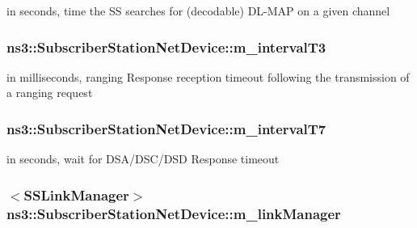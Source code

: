 in seconds, time the SS searches for (decodable) D\+L-\/\+M\+AP on a given channel 

\subsubsection[{\texorpdfstring{m\+\_\+interval\+T3}{m_intervalT3}}]{ ns3\+::\+Subscriber\+Station\+Net\+Device\+::m\+\_\+interval\+T3\hspace{0.3cm}{\ttfamily [private]}}\hypertarget{classns3_1_1SubscriberStationNetDevice_acdf9ce2c9f951c3c8433e36f48058d86}{}\label{classns3_1_1SubscriberStationNetDevice_acdf9ce2c9f951c3c8433e36f48058d86}


in milliseconds, ranging Response reception timeout following the transmission of a ranging request 

\subsubsection[{\texorpdfstring{m\+\_\+interval\+T7}{m_intervalT7}}]{ ns3\+::\+Subscriber\+Station\+Net\+Device\+::m\+\_\+interval\+T7\hspace{0.3cm}{\ttfamily [private]}}\hypertarget{classns3_1_1SubscriberStationNetDevice_afa2eaee4151fb1ddbfa95394ac7ae662}{}\label{classns3_1_1SubscriberStationNetDevice_afa2eaee4151fb1ddbfa95394ac7ae662}


in seconds, wait for D\+S\+A/\+D\+S\+C/\+D\+SD Response timeout 

\subsubsection[{\texorpdfstring{m\+\_\+link\+Manager}{m_linkManager}}]{$<${\bf S\+S\+Link\+Manager}$>$ ns3\+::\+Subscriber\+Station\+Net\+Device\+::m\+\_\+link\+Manager}\hypertarget{classns3_1_1SubscriberStationNetDevice_a24e7df59fb312c196318f0366b63c6e6}{}\label{classns3_1_1SubscriberStationNetDevice_a24e7df59fb312c196318f0366b63c6e6}


